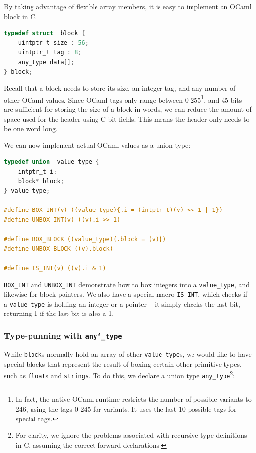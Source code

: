 \documentclass[12pt,a4paper,twoside,openright]{report}
\begin{document}
By taking advantage of flexible array members, it is easy to implement an OCaml 
block in C.

\begin{lstlisting}[language=C]
typedef struct _block {
    uintptr_t size : 56;
    uintptr_t tag : 8;
    any_type data[];
} block;
\end{lstlisting}

Recall that a block needs to store its size, an integer tag, and any number of
other OCaml values. Since OCaml tags only range between 0-255\footnote{In fact,
    the native OCaml runtime restricts the number of possible variants to 246,
    using the tags 0-245 for variants. It uses the last 10 possible tags for
special tags.}, and 45 bits are sufficient for storing the size of a block in
words, we can reduce the amount of space used for the header using C bit-fields.
This means the header only needs to be one word long.

We can now implement actual OCaml values as a union type:

\begin{lstlisting}[language=C]
typedef union _value_type {
    intptr_t i;
    block* block;
} value_type;

#define BOX_INT(v) ((value_type){.i = (intptr_t)(v) << 1 | 1})
#define UNBOX_INT(v) ((v).i >> 1)

#define BOX_BLOCK ((value_type){.block = (v)})
#define UNBOX_BLOCK ((v).block)

#define IS_INT(v) ((v).i & 1)
\end{lstlisting}

\verb|BOX_INT| and \verb|UNBOX_INT| demonstrate how to box integers into a 
\verb|value_type|, and likewise for block pointers. We also have a special 
macro \verb|IS_INT|, which checks if a \verb|value_type| is holding an integer 
or a pointer -- it simply checks the last bit, returning 1 if the last bit is 
also a 1.

\subsubsection{Type-punning with \texttt{any\char`_type}}

While \texttt{block}s normally hold an array of other \verb|value_type|s, we
would like to have special blocks that represent the result of boxing certain
other primitive types, such as \texttt{float}s and \texttt{strings}. To do this,
we declare a union type \verb|any_type|\footnote{For clarity, we ignore the
problems associated with recursive type definitions in C, assuming the correct
forward declarations.}:
\end{document}
